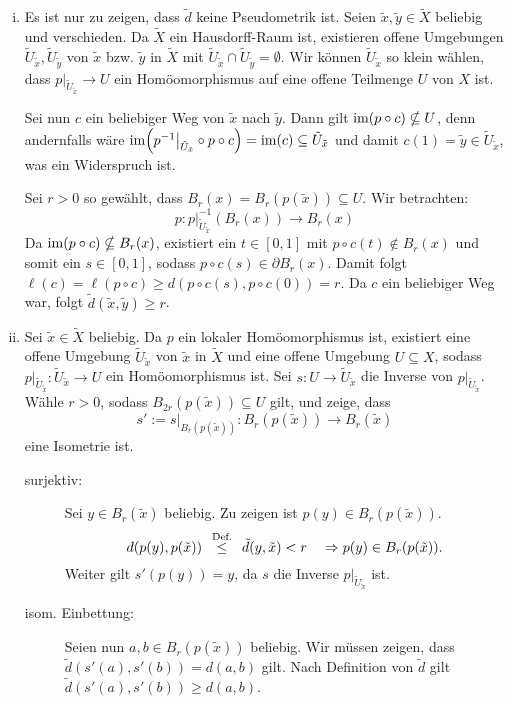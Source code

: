 \begin{beweis}
	\begin{enumerate}[(i)]
		\item Es ist nur zu zeigen, dass $\tilde{d}$ keine Pseudometrik ist. 
		Seien $\tilde{x},\tilde{y} \in \tilde{X}$ beliebig und verschieden.
		Da $\tilde{X}$ ein Hausdorff-Raum ist, existieren offene Umgebungen $\tilde{U}_{\tilde{x}}, \tilde{U}_{\tilde{y}}$ von $\tilde{x}$ bzw. $\tilde{y}$ in $\tilde{X}$ mit $\tilde{U}_{\tilde{x}} \cap \tilde{U}_{\tilde{y}} = \emptyset$.
		Wir können $\tilde{U}_{\tilde{x}}$ so klein wählen, dass $p \big|_{\tilde{U}_{\tilde{x}}} \rightarrow U$ ein Homöomorphismus auf eine offene Teilmenge $U$ von $X$ ist.
		
		Sei nun $c$ ein beliebiger Weg von $\tilde{x}$ nach $\tilde{y}$.
		Dann gilt $\operatorname{im}(p \circ c) \nsubseteq U$, denn andernfalls wäre $\im\enbrace*{p^{-1} \big|_{\tilde{U}_{\tilde{x}}} \circ p \circ c} = \im(c) \subseteq \tilde{U}_{\tilde{x}}$ und damit $c(1) = \tilde{y} \in \tilde{U}_{\tilde{x}}$, was ein Widerspruch ist.
		
		Sei $r > 0$ so gewählt, dass $B_r(x) = B_r(p(\tilde{x})) \subseteq U$.
		Wir betrachten:
		\[
			p\colon p \big|_{\tilde{U}_{\tilde{x}}}^{-1} (B_r(x)) \rightarrow B_r(x)
		\]
		Da $\operatorname{im}(p \circ c) \nsubseteq B_r(x)$, existiert ein $t \in [0,1]$ mit $p \circ c(t) \notin B_r(x)$ und somit ein $s \in [0,1]$, sodass $p \circ c(s) \in \partial B_r(x)$.
		Damit folgt $\ell(c) = \ell(p \circ c) \geq d(p \circ c (s), p \circ c(0)) = r$.
		Da $c$ ein beliebiger Weg war, folgt $\tilde{d}(\tilde{x},\tilde{y}) \geq r$.
		\item Sei $\tilde{x} \in \tilde{X}$ beliebig.
		Da $p$ ein lokaler Homöomorphismus ist, existiert eine offene Umgebung $\tilde{U}_{\tilde{x}}$ von $\tilde{x}$ in $\tilde{X}$ und eine offene Umgebung $U \subseteq X$, sodass $p \big|_{\tilde{U}_{\tilde{x}}} \colon \tilde{U}_{\tilde{x}} \rightarrow U$ ein Homöomorphismus ist.
		Sei $s \colon U \rightarrow \tilde{U}_{\tilde{x}}$ die Inverse von $p \big|_{\tilde{U}_{\tilde{x}}}$.
		Wähle $r > 0$, sodass $B_{2r}(p(\tilde{x})) \subseteq U$ gilt, und zeige, dass
		\[
			s' := s \big|_{B_r(p(\tilde{x}))} \colon B_r(p(\tilde{x})) \rightarrow B_r(\tilde{x})
		\]
		eine Isometrie ist.
		\begin{description}
			\item[surjektiv:] Sei $y \in B_r(\tilde{x})$ beliebig.
			Zu zeigen ist $p(y) \in B_r(p(\tilde{x}))$.
			\[
				d(p(y),p(\tilde{x})) \stack{\text{Def.}}{\leq} \tilde{d}(y,\tilde{x}) < r \quad \Rightarrow p(y) \in B_r(p(\tilde{x})).
			\] 
			Weiter gilt $s'(p(y)) = y$, da $s$ die Inverse $p\big|_{\tilde{U}_{\tilde{x}}}$ ist.
			\item[isom. Einbettung:] Seien nun $a,b \in B_r(p(\tilde{x}))$ beliebig.
			Wir müssen zeigen, dass $\tilde{d}(s'(a),s'(b)) = d(a,b)$ gilt.
			Nach Definition von $\tilde{d}$ gilt $\tilde{d}(s'(a),s'(b)) \geq d(a,b)$.
			

\end{description}
\end{enumerate}
\end{beweis}
